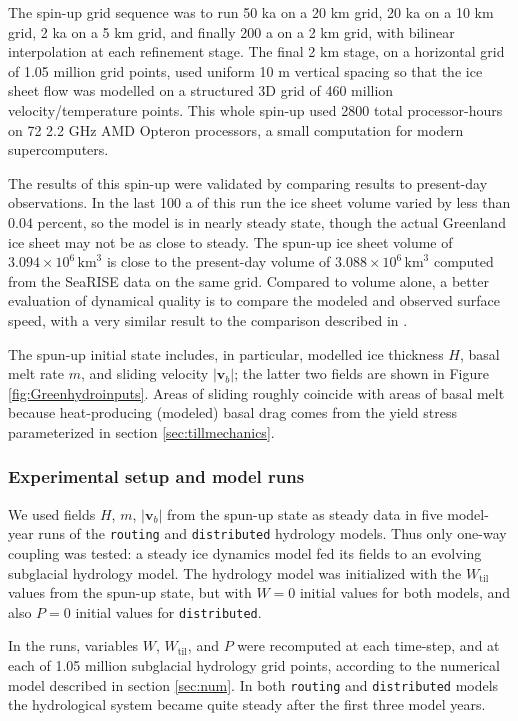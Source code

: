 \documentclass[gmd]{copernicus}   %
\newcommand{\text}{\textrm}
\newcommand\bv{\mathbf{v}}
\newcommand{\Wtil}{W_{\text{til}}}
\begin{document}
The spin-up grid sequence was to run 50 ka on a 20 km grid, 20 ka on a 10 km grid, 2 ka on a 5 km grid, and finally 200 a on a 2 km grid, with bilinear interpolation at each refinement stage.  The final 2 km stage, on a horizontal grid of 1.05 million grid points, used uniform 10 m vertical spacing so that the ice sheet flow was modelled on a structured 3D grid of 460 million velocity/temperature points.  This whole spin-up used 2800 total processor-hours on 72 2.2 GHz AMD Opteron processors, a small computation for modern supercomputers.

The results of this spin-up were validated by comparing results to present-day observations.  In the last 100 a of this run the ice sheet volume varied by less than $0.04$ percent, so the model is in nearly steady state, though the actual Greenland ice sheet may not be as close to steady.  The spun-up ice sheet volume of $3.094\times 10^{6}\,\textrm{km}^3$ is close to the present-day volume of $3.088\times 10^{6}\,\textrm{km}^3$ computed from the SeaRISE data on the same grid.  Compared to volume alone, a better evaluation of dynamical quality is to compare the modeled and observed \citep{Joughinetal2010} surface speed, with a very similar result to the comparison described in \cite{AschwandenAdalgeirsdottirKhroulev}.

The spun-up initial state includes, in particular, modelled ice thickness $H$, basal melt rate $m$, and sliding velocity $|\bv_b|$; the latter two fields are shown in Figure \ref{fig:Greenhydroinputs}.  Areas of sliding roughly coincide with areas of basal melt because heat-producing (modeled) basal drag comes from the yield stress parameterized in section \ref{sec:tillmechanics}.

\subsubsection{Experimental setup and model runs}  We used fields $H$, $m$, $|\bv_b|$ from the spun-up state as steady data in five model-year runs of the \texttt{routing} and \texttt{distributed} hydrology models.  Thus only one-way coupling was tested: a steady ice dynamics model fed its fields to an evolving subglacial hydrology model.  The hydrology model was initialized with the $\Wtil$ values from the spun-up state, but with $W=0$ initial values for both models, and also $P=0$ initial values for \texttt{distributed}.

In the runs, variables $W$, $\Wtil$, and $P$ were recomputed at each time-step, and at each of 1.05 million subglacial hydrology grid points, according to the numerical model described in section \ref{sec:num}.  In both \texttt{routing} and \texttt{distributed} models the hydrological system became quite steady after the first three model years.
\end{document}

